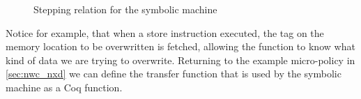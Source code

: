 \begin{figure}[htb]
\bigskip

\bigskip

\bigskip

\bigskip


\caption{Stepping relation for the symbolic machine}
\label{symbolic_step}
\end{figure}

Notice for example, that when a store instruction executed, the tag on
the memory location to be overwritten is fetched, allowing the
\TRANSFER function to know what kind of data we are trying to
overwrite. Returning to the example micro-policy in \ref{sec:nwc_nxd}
we can define the transfer function that is used by the symbolic machine
as a Coq function.

